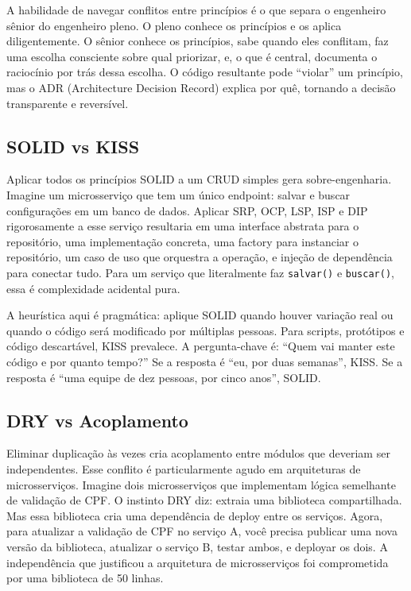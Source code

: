 A habilidade de navegar conflitos entre princípios é o que separa o engenheiro
sênior do engenheiro pleno. O pleno conhece os princípios e os aplica
diligentemente. O sênior conhece os princípios, sabe quando eles conflitam,
faz uma escolha consciente sobre qual priorizar, e, o que é central,
documenta o raciocínio por trás dessa escolha. O código resultante pode
``violar'' um princípio, mas o ADR (Architecture Decision Record) explica
por quê, tornando a decisão transparente e reversível.

\subsection{SOLID vs KISS}

Aplicar todos os princípios SOLID a um CRUD simples gera sobre-engenharia.
Imagine um microsserviço que tem um único endpoint: salvar e buscar
configurações em um banco de dados. Aplicar SRP, OCP, LSP, ISP e DIP
rigorosamente a esse serviço resultaria em uma interface abstrata para o
repositório, uma implementação concreta, uma factory para instanciar o
repositório, um caso de uso que orquestra a operação, e injeção de
dependência para conectar tudo. Para um serviço que literalmente faz
\texttt{salvar()} e \texttt{buscar()}, essa é complexidade acidental pura.

A heurística aqui é pragmática: aplique SOLID quando houver variação real
ou quando o código será modificado por múltiplas pessoas. Para scripts,
protótipos e código descartável, KISS prevalece. A pergunta-chave é:
``Quem vai manter este código e por quanto tempo?'' Se a resposta é ``eu,
por duas semanas'', KISS. Se a resposta é ``uma equipe de dez pessoas, por
cinco anos'', SOLID.

\subsection{DRY vs Acoplamento}

Eliminar duplicação às vezes cria acoplamento entre módulos que deveriam ser
independentes. Esse conflito é particularmente agudo em arquiteturas de
microsserviços. Imagine dois microsserviços que implementam lógica semelhante
de validação de CPF. O instinto DRY diz: extraia uma biblioteca compartilhada.
Mas essa biblioteca cria uma dependência de deploy entre os serviços. Agora,
para atualizar a validação de CPF no serviço A, você precisa publicar uma
nova versão da biblioteca, atualizar o serviço B, testar ambos, e deployar
os dois. A independência que justificou a arquitetura de microsserviços foi
comprometida por uma biblioteca de 50 linhas.

